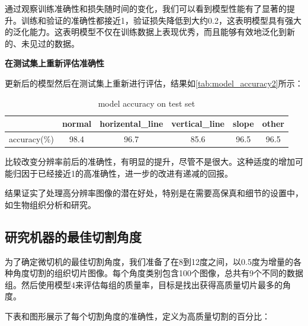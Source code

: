 通过观察训练准确性和损失随时间的变化，我们可以看到模型性能有了显著的提升。训练和验证的准确性都接近1，验证损失降低到大约0.2，这表明模型具有强大的泛化能力。这表明模型不仅在训练数据上表现优秀，而且能够有效地泛化到新的、未见过的数据。

\textbf{在测试集上重新评估准确性}

更新后的模型然后在测试集上重新进行评估，结果如\autoref{tab:model_accuracy2}所示：

\begin{table}
    \centering
    \caption{model accuracy on test set}
    \begin{tabular}{cccccc}
        \toprule
        & normal & horizental\_line & vertical\_line & slope & other \\
        \midrule
        accuracy(\%) & 98.4 & 96.7 & 85.6 & 96.5 & 96.5 \\
        \bottomrule
    \end{tabular}
    \label{tab:model_accuracy2}
    \end{table}

比较改变分辨率前后的准确性，有明显的提升，尽管不是很大。这种适度的增加可能归因于已经接近1的高准确性，进一步的改进有递减的回报。

结果证实了处理高分辨率图像的潜在好处，特别是在需要高保真和细节的设置中，如生物组织分析和研究。

\subsection{研究机器的最佳切割角度}

为了确定微切机的最佳切割角度，我们准备了在8到12度之间，以0.5度为增量的各种角度切割的组织切片图像。每个角度类别包含100个图像，总共有9个不同的数据组。然后使用模型4来评估每组的质量率，目标是找出获得高质量切片最多的角度。

下表和图形展示了每个切割角度的准确性，定义为高质量切割的百分比：

